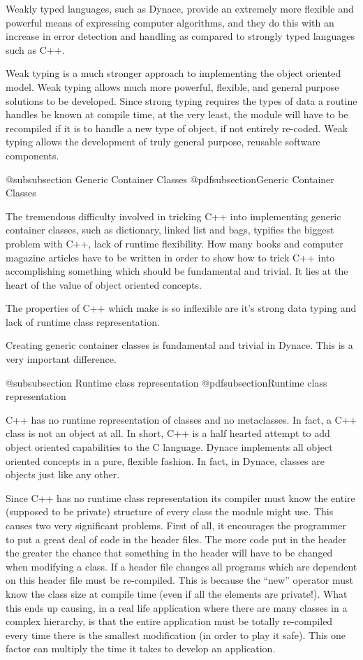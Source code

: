 Weakly typed languages, such as Dynace, provide an extremely more
flexible and powerful means of expressing computer algorithms, and
they do this with an increase in error detection and handling as
compared to strongly typed languages such as C++.

Weak typing is a much stronger approach to implementing the object
oriented model.  Weak typing allows much more powerful, flexible, and
general purpose solutions to be developed.  Since strong typing
requires the types of data a routine handles be known at compile time,
at the very least, the module will have to be recompiled if it is to
handle a new type of object, if not entirely re-coded.  Weak typing
allows the development of truly general purpose, reusable software
components.

@subsubsection Generic Container Classes
@pdfsubsection{Generic Container Classes}

The tremendous difficulty involved in tricking C++ into implementing
generic container classes, such as dictionary, linked list and bags,
typifies the biggest problem with C++, lack of runtime flexibility.
How many books and computer magazine articles have to be written
in order to show how to trick C++ into accomplishing something
which should be fundamental and trivial.  It lies at the heart of
the value of object oriented concepts.

The properties of C++ which make is so inflexible are it's strong data
typing and lack of runtime class representation.

Creating generic container classes is fundamental and trivial in Dynace.
This is a very important difference.

@subsubsection Runtime class representation
@pdfsubsection{Runtime class representation}

C++ has no runtime representation of classes and no metaclasses.  In
fact, a C++ class is not an object at all.  In short, C++ is a half
hearted attempt to add object oriented capabilities to the C language.
Dynace implements all object oriented concepts in a pure, flexible fashion.
In fact, in Dynace, classes are objects just like any other.

Since C++ has no runtime class representation its compiler must know
the entire (supposed to be private) structure of every class the module
might use.  This causes two very significant problems.  First of all,
it encourages the programmer to put a great deal of code in the header
files.  The more code put in the header the greater the chance that
something in the header will have to be changed when modifying a class.
If a header file changes all programs which are dependent on this
header file must be re-compiled.  This is because the ``new'' operator
must know the class size at compile time (even if all the elements are
private!).  What this ends up causing, in a real life application
where there are many classes in a complex hierarchy, is that the
entire application must be totally re-compiled every time there is the
smallest modification (in order to play it safe).  This one factor can
multiply the time it takes to develop an application.

